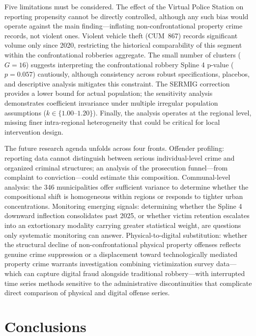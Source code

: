 \documentclass[pdflatex,sn-basic]{sn-jnl}
\begin{document}
Five limitations must be considered. The effect of the Virtual Police Station on reporting propensity cannot be directly controlled, although any such bias would operate against the main finding---inflating non-confrontational property crime records, not violent ones. Violent vehicle theft (CUM~867) records significant volume only since 2020, restricting the historical comparability of this segment within the confrontational robberies aggregate. The small number of clusters ($G=16$) suggests interpreting the confrontational robbery Spline 4 p-value ($p=0.057$) cautiously, although consistency across robust specifications, placebos, and descriptive analysis mitigates this constraint. The SERMIG correction provides a lower bound for actual population; the sensitivity analysis demonstrates coefficient invariance under multiple irregular population assumptions ($k \in \{1.00\text{--}1.20\}$). Finally, the analysis operates at the regional level, missing finer intra-regional heterogeneity that could be critical for local intervention design.

The future research agenda unfolds across four fronts. Offender profiling: reporting data cannot distinguish between serious individual-level crime and organized criminal structures; an analysis of the prosecution funnel---from complaint to conviction---could estimate this composition. Communal-level analysis: the 346 municipalities offer sufficient variance to determine whether the compositional shift is homogeneous within regions or responds to tighter urban concentrations. Monitoring emerging signals: determining whether the Spline 4 downward inflection consolidates past 2025, or whether victim retention escalates into an extortionary modality carrying greater statistical weight, are questions only systematic monitoring can answer. Physical-to-digital substitution: whether the structural decline of non-confrontational physical property offenses reflects genuine crime suppression or a displacement toward technologically mediated property crime warrants investigation combining victimization survey data---which can capture digital fraud alongside traditional robbery---with interrupted time series methods sensitive to the administrative discontinuities that complicate direct comparison of physical and digital offense series.

\section{Conclusions}
\label{sec:conclusiones}
\end{document}
